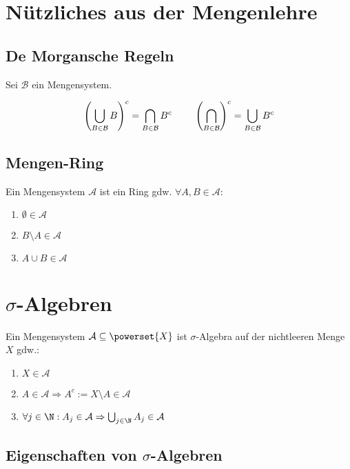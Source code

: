 \newcommand{\A}{\mathcal{A}}
\newcommand{\B}{\mathcal{B}}
\newcommand{\C}{\mathcal{C}}
\newcommand{\E}{\mathcal{E}}
\newcommand{\J}{\mathcal{J}}
\newcommand{\F}{\mathcal{F}}

\section*{Nützliches aus der Mengenlehre}

\subsection*{De Morgansche Regeln}

Sei $\B$ ein Mengensystem.

$$\left(\bigcup_{B\in \B} B \right)^c = \bigcap_{B\in \B} B^c \hspace*{8mm} \left(\bigcap_{B\in \B} \right)^c = \bigcup_{B\in \B} B^c$$

\subsection*{Mengen-Ring}

Ein Mengensystem $\A$ ist ein Ring gdw. $\forall A, B \in \A$:

\begin{enumerate}[label=(\alph*)]
	\item $\emptyset \in \A$
	\item $B\setminus A \in \A$
	\item $A \cup B \in \A$
\end{enumerate}

\section*{$\sigma$-Algebren}

Ein Mengensystem $\A \subseteq \powerset{X}$ ist $\sigma$-Algebra auf der nichtleeren Menge $X$ gdw.:

\begin{enumerate}[label=(\alph*)]
	\item $X \in \A$
	\item $A \in \A \Rightarrow A^c := X\setminus A \in \A$
	\item $\forall j \in \N : A_j \in \A \Rightarrow \bigcup_{j\in \N} A_j \in \A$
\end{enumerate}

\subsection*{Eigenschaften von $\sigma$-Algebren}

